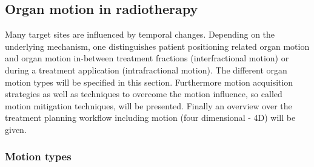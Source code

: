 
\subsection{Organ motion in radiotherapy}

Many target sites are influenced by temporal changes. Depending on the underlying mechanism, one distinguishes patient positioning 
related organ motion and organ motion in-between treatment fractions (interfractional motion) or during a treatment 
application (intrafractional motion). The different organ motion types will be specified in this section. Furthermore motion acquisition 
strategies as well as techniques to overcome the motion influence, so called motion mitigation techniques, will be presented. Finally an 
overview over the treatment planning workflow including motion (four dimensional - 4D) will be given. 

\subsubsection{Motion types}

